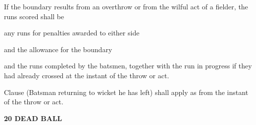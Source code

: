 \documentclass[12pt]{article}
\begin{document}
\vspace{\baselineskip}
{\fontsize{9pt}{10.8pt}\selectfont If the boundary results from an overthrow or from the wilful act of a fielder, the runs scored shall be\par}\par


\vspace{\baselineskip}
{\fontsize{9pt}{10.8pt}\selectfont any runs for penalties awarded to either side\par}\par


\vspace{\baselineskip}
{\fontsize{9pt}{10.8pt}\selectfont and the allowance for the boundary\par}\par


\vspace{\baselineskip}

\vspace{\baselineskip}

\vspace{\baselineskip}

\vspace{\baselineskip}
\begin{Center}
{\fontsize{8pt}{9.6pt}\par}
\end{Center}\par


\vspace{\baselineskip}

\vspace{\baselineskip}
\begin{adjustwidth}{0.0in}{0.03in}
{\fontsize{9pt}{10.8pt}\selectfont and the runs completed by the batsmen, together with the run in progress if they had already crossed at the instant of the throw or act.\par}\par

\end{adjustwidth}


\vspace{\baselineskip}
{\fontsize{9pt}{10.8pt}\selectfont Clause (Batsman returning to wicket he has left) shall apply as from the instant of the throw or act.\par}\par


\vspace{\baselineskip}
{\fontsize{16pt}{19.2pt}\selectfont \textbf{20 DEAD BALL}\par}\par
\end{document}
